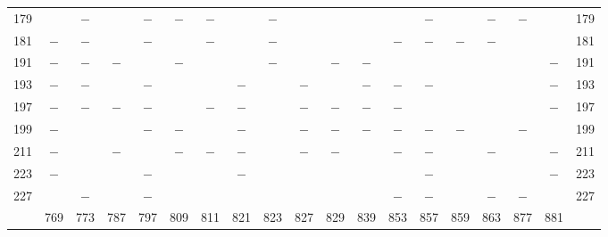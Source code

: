\begin{center}
\begin{tabular}{r|c|c|c|c|c|c|c|c|c|c|c|c|c|c|c|c|c|r}
179 &  & $-$ &  & $-$ & $-$ & $-$ &  & $-$ &  &  &  &  & $-$ &  & $-$ & $-$ &  & 179\\
181 & $-$ & $-$ &  & $-$ &  & $-$ &  & $-$ &  &  &  & $-$ & $-$ & $-$ & $-$ &  &  & 181\\
191 & $-$ & $-$ & $-$ &  & $-$ &  &  & $-$ &  & $-$ & $-$ &  &  &  &  &  & $-$ & 191\\
193 & $-$ & $-$ &  & $-$ &  &  & $-$ &  & $-$ &  & $-$ & $-$ & $-$ &  &  &  & $-$ & 193\\
197 & $-$ & $-$ & $-$ & $-$ &  & $-$ & $-$ &  & $-$ & $-$ & $-$ & $-$ &  &  &  &  & $-$ & 197\\
199 & $-$ &  &  & $-$ & $-$ &  & $-$ &  & $-$ & $-$ & $-$ & $-$ & $-$ & $-$ &  & $-$ &  & 199\\
211 & $-$ &  & $-$ &  & $-$ & $-$ & $-$ &  & $-$ & $-$ &  & $-$ & $-$ &  & $-$ &  & $-$ & 211\\
223 & $-$ &  &  & $-$ &  &  & $-$ &  &  &  &  &  & $-$ &  &  &  & $-$ & 223\\
227 &  & $-$ &  & $-$ &  &  &  &  &  &  &  & $-$ & $-$ &  & $-$ & $-$ &  & 227\\
\hline
 & 769 & 773 & 787 & 797 & 809 & 811 & 821 & 823 & 827 & 829 & 839 & 853 & 857 & 859 & 863 & 877 & 881 & \\
\hline
\end{tabular}\endgroup\end{center}
\clearpage
